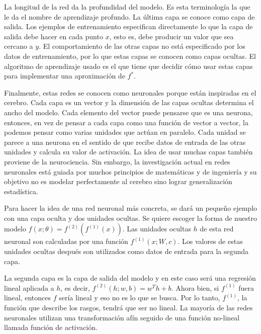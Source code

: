 \vspace{1em}

La longitud de la red da la profundidad del modelo. Es esta terminología la que le da el nombre de aprendizaje profundo. La última capa se conoce como capa de salida. Los ejemplos de entrenamiento especifican directamente lo que la capa de salida debe hacer en cada punto $x$, esto es, debe producir un valor que sea cercano a $y$. El comportamiento de las otras capas no está especificado por los datos de entrenamiento, por lo que estas capas se conocen como capas ocultas. El algoritmo de aprendizaje usado es el que tiene que decidir cómo usar estas capas para implementar una aproximación de $f^*$.

\vspace{1em}

Finalmente, estas redes se conocen como neuronales porque están inspiradas en el cerebro. Cada capa es un vector y la dimensión de las capas ocultas determina el ancho del modelo. Cada elemento del vector puede pensarse que es una neurona, entonces, en vez de pensar a cada capa como una función de vector a vector, la podemos pensar como varias unidades que actúan en paralelo. Cada unidad se parece a una neurona en el sentido de que recibe datos de entrada de las otras unidades y calcula su valor de activación. La idea de usar muchas capas también proviene de la neurociencia. Sin embargo, la investigación actual en redes neuronales está guiada por muchos principios de matemáticas y de ingeniería y su objetivo no es modelar perfectamente al cerebro sino lograr generalización estadística.
\cite{goodfellow-et-al-2016}

\vspace{1em}

Para hacer la idea de una red neuronal más concreta, se dará un pequeño ejemplo con una capa oculta y dos unidades ocultas. Se quiere escoger la forma de nuestro modelo $f(x;\theta) = f^{(2)}(f^{(1)}(x))$. Las unidades ocultas $h$ de esta red neuronal son calculadas por una función $f^{(1)}(x;W,c)$. Los valores de estas unidades ocultas después son utilizados como datos de entrada para la segunda capa. 

\vspace{1em}

La segunda capa es la capa de salida del modelo y en este caso será una regresión lineal aplicada a $h$, es decir, $f^{(2)}(h;w,b) = w^Th + b$. Ahora bien, si $f^{(1)}$ fuera lineal, entonces $f$ sería lineal y eso no es lo que se busca. Por lo tanto, $f^{(1)}$, la función que describe los rasgos, tendrá que ser no lineal. La mayoría de las redes neuronales utilizan una transformación afín seguido de una función no-lineal llamada función de activación. 
\cite{goodfellow-et-al-2016}

